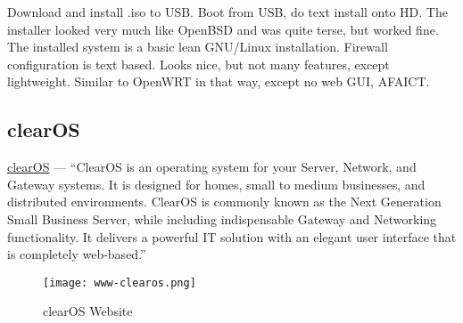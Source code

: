Download and install .iso to USB. Boot from USB, do text install onto HD. The installer looked very much like OpenBSD and was quite terse, but worked fine.
The installed system is a basic lean GNU/Linux installation. Firewall configuration is text based. Looks nice, but not many features, except lightweight.
Similar to OpenWRT in that way, except no web GUI, AFAICT.


\subsection{clearOS}

\href{https://www.clearos.com/}{clearOS} --- ``ClearOS is an operating system for your Server, Network, and Gateway systems. It is designed for homes, small to medium businesses, and distributed environments. ClearOS is commonly known as the Next Generation Small Business Server, while including indispensable Gateway and Networking functionality. It delivers a powerful IT solution with an elegant user interface that is completely web-based.''

\begin{figure}[h!]
\texttt{[image: www-clearos.png]}
 \caption{clearOS Website}
 \label{fig:www-clearos}
\end{figure}

